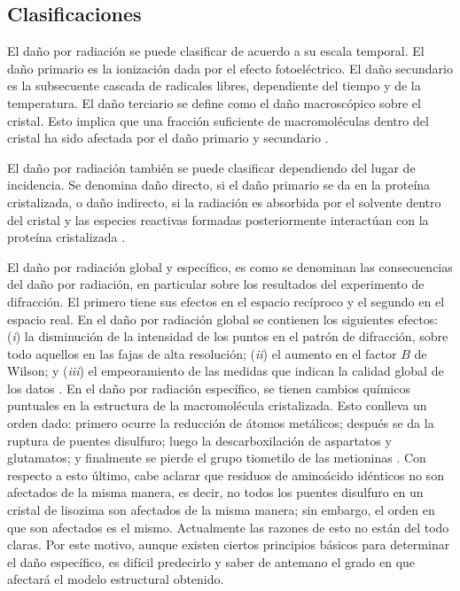 \subsection{Clasificaciones}
El daño por radiación se puede clasificar de acuerdo a su escala temporal. El daño primario es la ionización dada por el efecto fotoeléctrico. El daño secundario es la subsecuente cascada de radicales libres, dependiente del tiempo y de la temperatura. El daño terciario se define como el daño macroscópico sobre el cristal. Esto implica que una fracción suficiente de macromoléculas dentro del cristal ha sido afectada por el daño primario y secundario .

El daño por radiación también se puede clasificar dependiendo del lugar de incidencia. Se denomina daño directo, si el daño primario se da en la proteína cristalizada, o daño indirecto, si la radiación es absorbida por el solvente dentro del cristal y las especies reactivas formadas posteriormente interactúan con la proteína cristalizada .

El daño por radiación global y específico, es como se denominan las consecuencias del daño por radiación, en particular sobre los resultados del experimento de difracción. El primero tiene sus efectos en el espacio recíproco y el segundo en el espacio real. En el daño por radiación global se contienen los siguientes efectos: (\emph{i}) la disminución de la intensidad de los puntos en el patrón de difracción, sobre todo aquellos en las fajas de alta resolución; (\emph{ii}) el aumento en el factor $B$ de Wilson; y (\emph{iii}) el empeoramiento de las medidas que indican la calidad global de los datos \cite{Teng2000}. En el daño por radiación específico, se tienen cambios químicos puntuales en la estructura de la macromolécula cristalizada. Esto conlleva un orden dado: primero ocurre la reducción de átomos metálicos; después se da la ruptura de puentes disulfuro; luego la descarboxilación de aspartatos y glutamatos; y finalmente se pierde el grupo tiometilo de las metioninas . Con respecto a esto último, cabe aclarar que residuos de aminoácido idénticos no son afectados de la misma manera, es decir, no todos los puentes disulfuro en un cristal de lisozima son afectados de la misma manera; sin embargo, el orden en que son afectados es el mismo. Actualmente las razones de esto no están del todo claras. Por este motivo, aunque existen ciertos principios básicos para determinar el daño específico, es difícil predecirlo y saber de antemano el grado en que afectará el modelo estructural obtenido.

